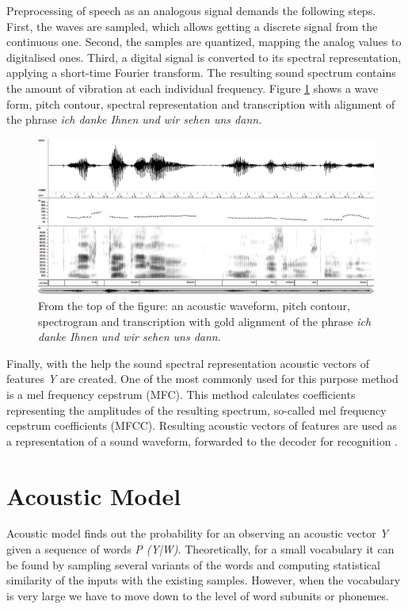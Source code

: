 Preprocessing of speech as an analogous signal demands the following steps. First, the waves are sampled, which allows getting a discrete signal from the 
continuous one. Second, the samples are quantized, mapping the analog values to digitalised ones. Third, a digital signal is converted to its 
spectral representation, applying a short-time Fourier transform. The resulting sound spectrum contains the amount of vibration at each individual frequency. 
Figure \ref {fig:spectro} shows a wave form, pitch contour, spectral
representation and transcription with alignment of the phrase \textit {ich danke
 Ihnen und wir sehen uns dann}.
\begin{figure}[htbp]
  \centering
    \includegraphics[width=1.0\textwidth]{images/spectro.png}
 \caption{From the top of the figure: an acoustic waveform, pitch contour,
 spectrogram and transcription with gold alignment of the phrase \textit {ich
 danke Ihnen und wir sehen uns dann}. }
  \label{fig:spectro}
\end {figure}

Finally, with the help the sound spectral representation acoustic vectors of
features \textit {Y} are created. One of the most commonly used for this purpose
method is a mel frequency cepstrum (MFC). This method calculates coefficients representing the amplitudes
of the resulting spectrum, so-called mel frequency cepstrum coefficients (MFCC).
Resulting acoustic vectors of features are used as a representation of a sound waveform, forwarded to the decoder for recognition  \parencite
{jurafskymartin2009}.

\section {Acoustic Model} 

Acoustic model finds out the probability for an observing an acoustic vector
\textit {Y } given a sequence of words \textit {P (Y|W)}. Theoretically, for a
small vocabulary it can be found by sampling several variants of the words and computing statistical similarity of the inputs with 
the existing samples. However, when the vocabulary is very large we have to move
down to the level of word subunits or phonemes.

